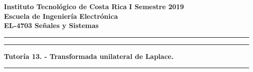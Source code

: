 
\onehalfspace
\noindent
\large\textbf{Instituto Tecnológico de Costa Rica} \hfill \textbf{I Semestre 2019} \\
\large\textbf{Escuela de Ingeniería Electrónica} \\
\large\textbf{EL-4703 Señales y Sistemas}

\noindent\rule[1mm]{\textwidth}{0.4pt}

\vspace{3mm}

\par\noindent\rule[-3mm]{\textwidth}{0.4pt}
\begin{center}
\Large\textbf{Tutoría 13. - Transformada unilateral de Laplace.}
\end{center}
\par\noindent\rule[6mm]{\textwidth}{0.4pt}

\vspace{2mm}

\setlength\parskip{3mm}
